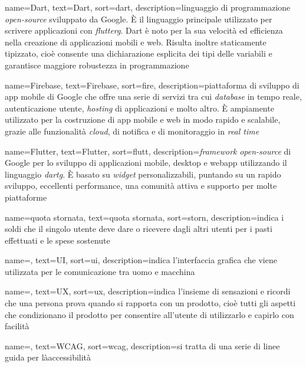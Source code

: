  {
    name=Dart,
    text=Dart,
    sort=dart,
    description={linguaggio di programmazione \textit{open-source} sviluppato da Google. 
    È il linguaggio principale utilizzato per scrivere applicazioni con \emph{\gls{flutterg}}. Dart è noto per la sua velocità ed efficienza nella creazione di applicazioni mobili e web.
    Risulta inoltre staticamente tipizzato, cioè consente una dichiarazione esplicita dei tipi delle variabili e garantisce maggiore robustezza in programmazione}
}

 {
    name=Firebase,
    text=Firebase,
    sort=fire,
    description={piattaforma di sviluppo di app mobile di Google che offre una serie di servizi tra cui \emph{database} in tempo reale, autenticazione utente, \emph{hosting} di applicazioni e molto altro. 
    È ampiamente utilizzato per la costruzione di app mobile e web in modo rapido e scalabile, grazie alle funzionalità \emph{cloud}, di notifica e di monitoraggio in \emph{real time}}
}

 {
    name=Flutter,
    text=Flutter,
    sort=flutt,
    description={\textit{framework} \textit{open-source} di Google per lo sviluppo di applicazioni mobile, desktop e webapp utilizzando il linguaggio \emph{\gls{dartg}}. È basato su \emph{widget} personalizzabili, puntando su un rapido sviluppo, eccellenti performance, una comunità attiva e supporto per molte piattaforme}
}

 {
    name=quota stornata,
    text=quota stornata,
    sort=storn,
    description={indica i soldi che il singolo utente deve dare o ricevere dagli altri utenti per i pasti effettuati e le spese sostenute}
}

 {
    name=,
    text=UI,
    sort=ui,
    description={indica l'interfaccia grafica che viene utilizzata per le comunicazione tra uomo e macchina}
}

 {
    name=,
    text=UX,
    sort=ux,
    description={indica l'insieme di sensazioni e ricordi che una persona prova quando si rapporta con un prodotto, cioè tutti gli aspetti che condizionano il prodotto per consentire all'utente di utilizzarlo e capirlo con facilità}
}

 {
    name=,
    text=WCAG,
    sort=wcag,
    description={si tratta di una serie di linee guida per làaccessibilità}
}
